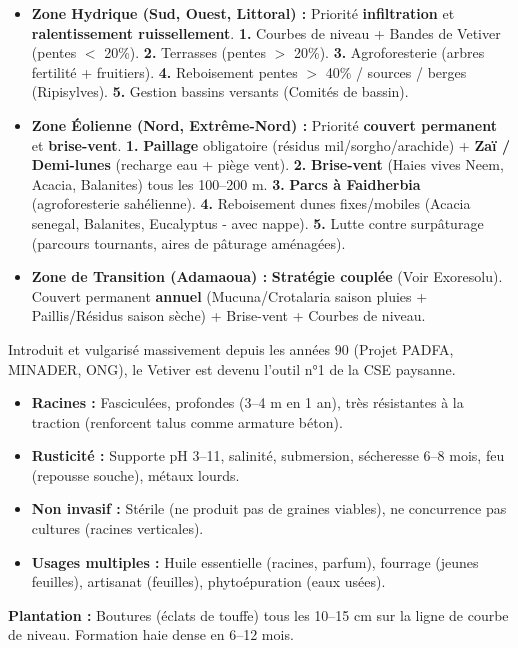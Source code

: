 \documentclass[11pt]{article}
\begin{document}
\begin{itemize}
    \item \textbf{Zone Hydrique (Sud, Ouest, Littoral) :} Priorité \textbf{infiltration} et \textbf{ralentissement ruissellement}. \textbf{1.} Courbes de niveau + Bandes de Vetiver (pentes $<$ 20\%). \textbf{2.} Terrasses (pentes $>$ 20\%). \textbf{3.} Agroforesterie (arbres fertilité + fruitiers). \textbf{4.} Reboisement pentes $>$ 40\% / sources / berges (Ripisylves). \textbf{5.} Gestion bassins versants (Comités de bassin).
    \item \textbf{Zone Éolienne (Nord, Extrême-Nord) :} Priorité \textbf{couvert permanent} et \textbf{brise-vent}. \textbf{1.} \textbf{Paillage} obligatoire (résidus mil/sorgho/arachide) + \textbf{Zaï / Demi-lunes} (recharge eau + piège vent). \textbf{2.} \textbf{Brise-vent} (Haies vives Neem, Acacia, Balanites) tous les 100--200 m. \textbf{3.} \textbf{Parcs à Faidherbia} (agroforesterie sahélienne). \textbf{4.} Reboisement dunes fixes/mobiles (Acacia senegal, Balanites, Eucalyptus - avec nappe). \textbf{5.} Lutte contre surpâturage (parcours tournants, aires de pâturage aménagées).
    \item \textbf{Zone de Transition (Adamaoua) :} \textbf{Stratégie couplée} (Voir Exoresolu). Couvert permanent \textbf{annuel} (Mucuna/Crotalaria saison pluies + Paillis/Résidus saison sèche) + Brise-vent + Courbes de niveau.
\end{itemize}

\begin{savaistu}
Introduit et vulgarisé massivement depuis les années 90 (Projet PADFA, MINADER, ONG), le Vetiver est devenu l'outil n°1 de la CSE paysanne.
\begin{itemize}
    \item \textbf{Racines :} Fasciculées, profondes (3--4 m en 1 an), très résistantes à la traction (renforcent talus comme armature béton).
    \item \textbf{Rusticité :} Supporte pH 3--11, salinité, submersion, sécheresse 6--8 mois, feu (repousse souche), métaux lourds.
    \item \textbf{Non invasif :} Stérile (ne produit pas de graines viables), ne concurrence pas cultures (racines verticales).
    \item \textbf{Usages multiples :} Huile essentielle (racines, parfum), fourrage (jeunes feuilles), artisanat (feuilles), phytoépuration (eaux usées).
\end{itemize}
\textbf{Plantation :} Boutures (éclats de touffe) tous les 10--15 cm sur la ligne de courbe de niveau. Formation haie dense en 6--12 mois.
\end{savaistu}
\end{document}
